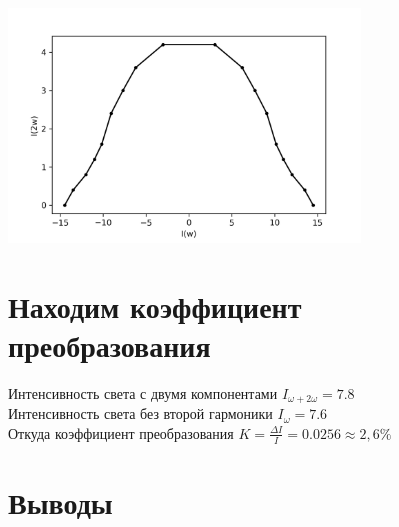 \documentclass[a4paper,14pt]{article} %
\begin{document}
\begin{center}
\includegraphics[width = 0.7\textwidth]{images/plot_2}
\end{center}

\section{Находим коэффициент преобразования}
Интенсивность света с двумя компонентами $I_{\omega + 2 \omega} = 7.8$\\
Интенсивность света без второй гармоники $I_{\omega} = 7.6$\\
Откуда коэффициент преобразования   $K = \frac{\Delta I}{I} = 0.0256 \approx 2,6 \%$\\

\section{Выводы}
\end{document}
